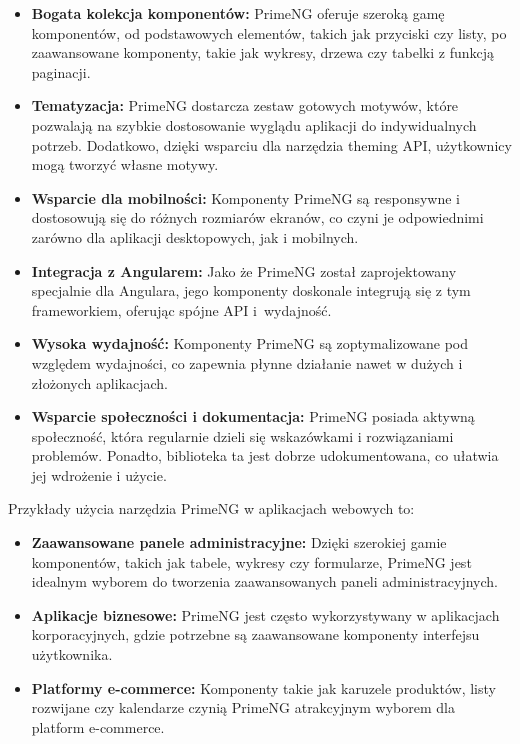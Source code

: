 \begin{itemize}
\item \textbf{Bogata kolekcja komponentów:} PrimeNG oferuje szeroką gamę komponentów, od podstawowych elementów, takich jak przyciski czy listy, po zaawansowane komponenty, takie jak wykresy, drzewa czy tabelki z funkcją paginacji.


\item \textbf{Tematyzacja:} PrimeNG dostarcza zestaw gotowych motywów, które pozwalają na szybkie dostosowanie wyglądu aplikacji do indywidualnych potrzeb. Dodatkowo, dzięki wsparciu dla narzędzia theming API, użytkownicy mogą tworzyć własne motywy.

\item \textbf{Wsparcie dla mobilności:} Komponenty PrimeNG są responsywne i dostosowują się do różnych rozmiarów ekranów, co czyni je odpowiednimi zarówno dla aplikacji desktopowych, jak i mobilnych.

\item \textbf{Integracja z Angularem:} Jako że PrimeNG został zaprojektowany specjalnie dla Angulara, jego komponenty doskonale integrują się z tym frameworkiem, oferując spójne API i~wydajność.

\item \textbf{Wysoka wydajność:} Komponenty PrimeNG są zoptymalizowane pod względem wydajności, co zapewnia płynne działanie nawet w dużych i złożonych aplikacjach.

\item \textbf{Wsparcie społeczności i dokumentacja:} PrimeNG posiada aktywną społeczność, która regularnie dzieli się wskazówkami i rozwiązaniami problemów. Ponadto, biblioteka ta jest dobrze udokumentowana, co ułatwia jej wdrożenie i użycie.
\end{itemize}

Przykłady użycia narzędzia PrimeNG w aplikacjach webowych to:

\begin{itemize}
\item \textbf{Zaawansowane panele administracyjne:} Dzięki szerokiej gamie komponentów, takich jak tabele, wykresy czy formularze, PrimeNG jest idealnym wyborem do tworzenia zaawansowanych paneli administracyjnych.

\item \textbf{Aplikacje biznesowe:} PrimeNG jest często wykorzystywany w aplikacjach korporacyjnych, gdzie potrzebne są zaawansowane komponenty interfejsu użytkownika.

\item \textbf{Platformy e-commerce:} Komponenty takie jak karuzele produktów, listy rozwijane czy kalendarze czynią PrimeNG atrakcyjnym wyborem dla platform e-commerce.
\end{itemize}

